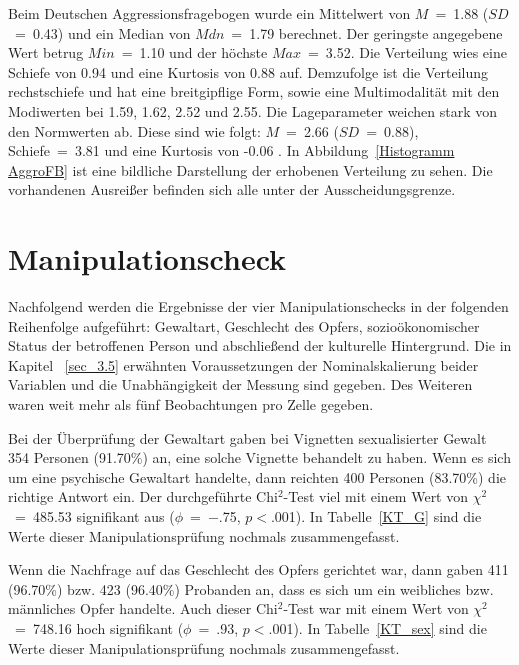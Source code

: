 
Beim Deutschen Aggressionsfragebogen wurde ein Mittelwert von $M$~=~1.88 ($SD$~=~0.43) und ein Median von $Mdn$~=~1.79 berechnet. Der geringste angegebene Wert betrug $Min$~=~1.10 und der höchste $Max$~=~3.52. Die Verteilung wies eine Schiefe von 0.94 und eine Kurtosis von 0.88 auf. Demzufolge ist die Verteilung rechstschiefe und hat eine breitgipflige Form, sowie eine Multimodalität mit den Modiwerten bei 1.59, 1.62, 2.52 und 2.55. Die Lageparameter weichen stark von den Normwerten ab. Diese sind wie folgt: $M$~=~2.66 ($SD$~=~0.88), Schiefe~=~3.81 und eine Kurtosis von -0.06 \parencite{Aggressionsfragebogen}. In Abbildung~\ref{Histogramm AggroFB} ist eine bildliche Darstellung der erhobenen Verteilung zu sehen. Die vorhandenen Ausreißer befinden sich alle unter der Ausscheidungsgrenze.


\section{Manipulationscheck}    \label{sec_4.2}
Nachfolgend werden die Ergebnisse der vier Manipulationschecks in der folgenden Reihenfolge aufgeführt: Gewaltart, Geschlecht des Opfers, sozioökonomischer Status der betroffenen Person und abschließend der kulturelle Hintergrund.
Die in Kapitel ~\ref{sec_3.5} erwähnten Voraussetzungen der Nominalskalierung beider Variablen und die Unabhängigkeit der Messung sind gegeben. Des Weiteren waren weit mehr als fünf Beobachtungen pro Zelle gegeben.




Bei der Überprüfung der Gewaltart gaben bei Vignetten sexualisierter Gewalt 354 Personen (91.70\%) an, eine solche Vignette behandelt zu haben. Wenn es sich um eine psychische Gewaltart handelte, dann reichten 400 Personen (83.70\%) die richtige Antwort ein. Der durchgeführte Chi$^2$-Test viel mit einem Wert von $\chi^2$~=~485.53 signifikant aus ($\phi$~=~$-$.75, $p<$.001). 
In Tabelle~\ref{KT_G} sind die Werte dieser Manipulationsprüfung nochmals zusammengefasst.

Wenn die Nachfrage auf das Geschlecht des Opfers gerichtet war, dann gaben 411 (96.70\%) bzw. 423 (96.40\%) Probanden an, dass es sich um ein weibliches bzw. männliches Opfer handelte. Auch dieser Chi$^2$-Test war mit einem Wert von $\chi^2$~=~748.16 hoch signifikant ($\phi$~=~.93, $p<$.001). 
In Tabelle~\ref{KT_sex} sind die Werte dieser Manipulationsprüfung nochmals zusammengefasst.

